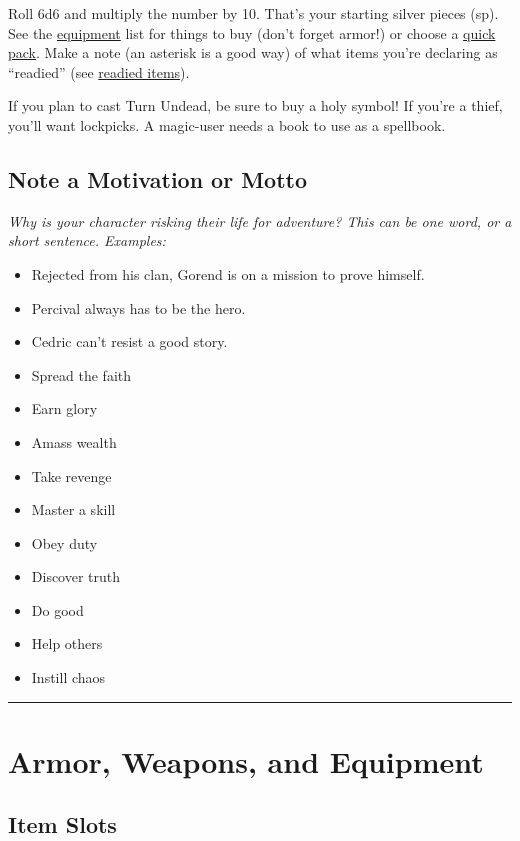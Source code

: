 \documentclass{article}
\begin{document}
\begin{multicols}{2}
Roll 6d6 and multiply the number by 10. That's your starting silver
pieces (sp). See the \hyperref[armor-weapons-and-equipment]{equipment}
list for things to buy (don't forget armor!) or choose a
\hyperref[quick-packs]{quick pack}. Make a note (an asterisk is a good
way) of what items you're declaring as ``readied'' (see
\hyperref[readied-items]{readied items}).

If you plan to cast Turn Undead, be sure to buy a holy symbol! If you're
a thief, you'll want lockpicks. A magic-user needs a book to use as a
spellbook.

\subsection{Note a Motivation or
Motto}\label{note-a-motivation-or-motto}

\emph{Why is your character risking their life for adventure? This can
be one word, or a short sentence. Examples:}

\begin{itemize}
\tightlist
\item
  Rejected from his clan, Gorend is on a mission to prove himself.
\item
  Percival always has to be the hero.
\item
  Cedric can't resist a good story.
\item
  Spread the faith
\item
  Earn glory
\item
  Amass wealth
\item
  Take revenge
\item
  Master a skill
\item
  Obey duty
\item
  Discover truth
\item
  Do good
\item
  Help others
\item
  Instill chaos
\end{itemize}

\begin{center}\rule{0.5\linewidth}{0.5pt}\end{center}

\section{Armor, Weapons, and
Equipment}\label{armor-weapons-and-equipment}

\subsection{Item Slots}\label{item-slots}


\end{multicols}
\end{document}
